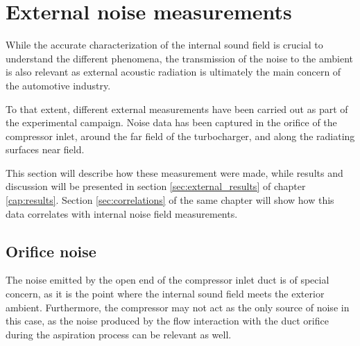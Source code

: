 


\section{External noise measurements}

While the accurate characterization of the internal sound field is crucial to understand the different phenomena, the transmission of the noise to the ambient is also relevant as external acoustic radiation is ultimately the main concern of the automotive industry.

To that extent, different external measurements have been carried out as part of the experimental campaign. Noise data has been captured in the orifice of the compressor inlet, around the far field of the turbocharger, and along the radiating surfaces near field.

This section will describe how these measurement were made, while results and discussion will be presented in section \ref{sec:external_results} of chapter \ref{cap:results}. Section \ref{sec:correlations} of the same chapter will show how this data correlates with internal noise field measurements.

\subsection{Orifice noise}
\label{sub:metod_orifice_noise}

The noise emitted by the open end of the compressor inlet duct is of special concern, as it is the point where the internal sound field meets the exterior ambient. Furthermore, the compressor may not act as the only source of noise in this case, as the noise produced by the flow interaction with the duct orifice during the aspiration process can be relevant as well.

